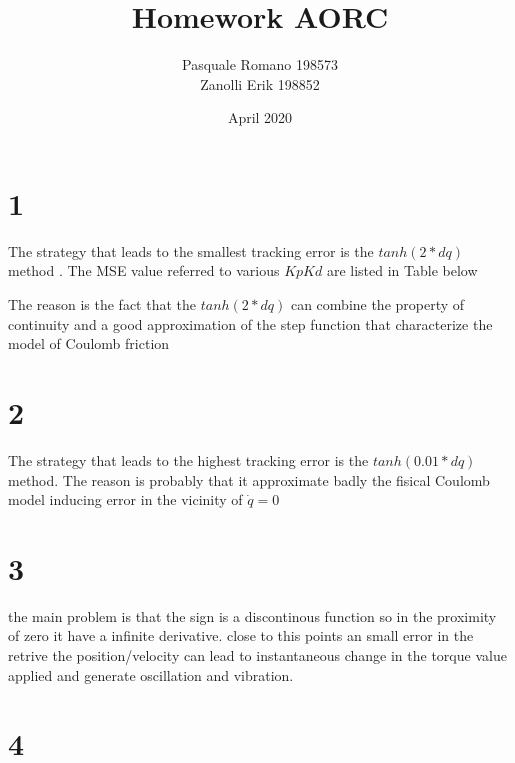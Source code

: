 \documentclass[onecolumn]{article}
\title{Homework AORC}
\author{
Pasquale Romano 198573 

Zanolli Erik 198852}
\date{April 2020}
\begin{document}
\maketitle



\section*{1}
\justify
The strategy that leads to the smallest tracking error is the $tanh(2*dq)$ method . The MSE value referred to various $Kp Kd$ are listed in Table below

The reason is the fact that the $tanh(2*dq)$ can combine the property of continuity and a good approximation of the step function that characterize the model of Coulomb friction

\section*{2}
The strategy that leads to the highest tracking error is the $tanh(0.01*dq)$ method. The reason is probably that it approximate badly the fisical Coulomb model inducing error in the vicinity of $\dot{q}=0$

\section*{3}
the main problem is that the sign is a discontinous function so in the proximity of zero it have a infinite derivative. close to this points an small error in the retrive the position/velocity can lead to 
instantaneous change in the torque value applied and generate oscillation and vibration.

\section*{4}
\end{document}
